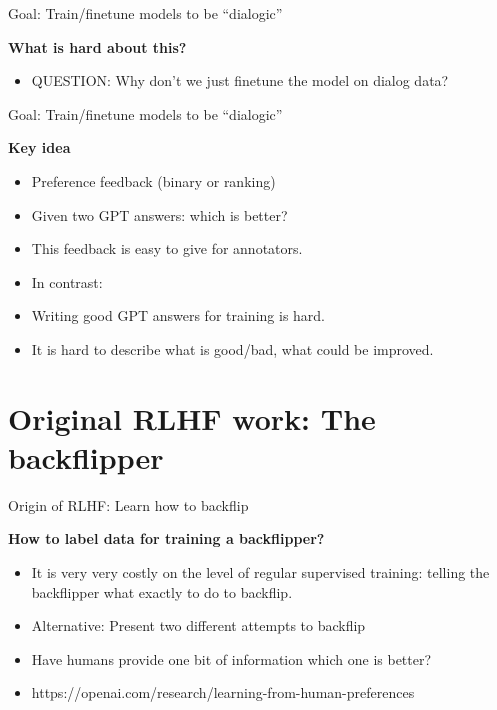 \begin{vbframe}{Goal: Train/finetune models to be ``dialogic''}

\vfill

\textbf{What is hard about this?}

	\begin{itemize}
		\item QUESTION: Why don't we just finetune the model
		on dialog data?
	\end{itemize}

\vfill

\end{vbframe}

\begin{vbframe}{Goal: Train/finetune models to be ``dialogic''}

\vfill

\textbf{Key idea}

	\begin{itemize}
		\item Preference feedback (binary or
                  ranking)
                  \item Given two GPT answers: which is
                    better?
                    \item This feedback is easy to give for
                      annotators.
                      \item In contrast:
                    \item Writing good GPT answers for
                      training is hard.
                    \item It is hard to describe what is good/bad,
                      what could be improved.
	\end{itemize}

\vfill

\end{vbframe}




\section{Original RLHF work: The backflipper}

\begin{vbframe}{Origin of RLHF: Learn how to backflip}

\vfill

\textbf{How to label data for training a backflipper?}

	\begin{itemize}
		\item It is very very costly on the level of
		regular supervised training: telling the
		backflipper what exactly to do to backflip.
                \item Alternative: Present two different
		attempts to backflip
                \item Have humans provide one bit of
		information which one is better?
\item https://openai.com/research/learning-from-human-preferences
	\end{itemize}

\vfill

\end{vbframe}


